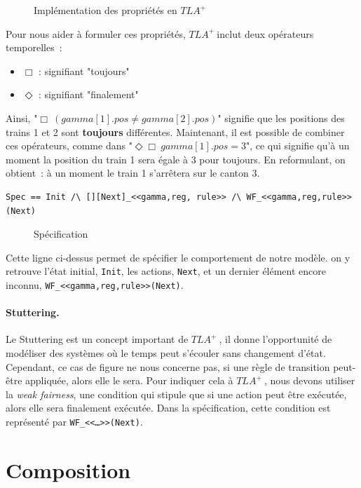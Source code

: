 \documentclass[oneside, a4paper, 11pt]{book}
\newcommand{\TLA}{\ensuremath{TLA^+~}}
\begin{document}
\begin{figure}[h]
	\caption{Implémentation des propriétés en \TLA}
	\label{fig:propertiesTLA}
\end{figure}

\noindent
Pour nous aider à formuler ces propriétés, \TLA inclut deux opérateurs temporelles~:
\begin{itemize}
	\item $\Box$ : signifiant "toujours"
	\item $\Diamond$ : signifiant "finalement"
\end{itemize}
\noindent
Ainsi, "$\Box~(gamma[1].pos \neq gamma[2].pos)$" signifie que les positions des trains 1 et 2 sont \textbf{toujours} différentes.
Maintenant, il est possible de combiner ces opérateurs, comme dans "$\Diamond \Box~gamma[1].pos = 3$", ce qui signifie qu'à un moment la position du train 1 sera égale à 3 pour toujours. En reformulant, on obtient~: à un moment le train 1 s'arrêtera sur le canton 3.

\begin{verbatim}
Spec == Init /\ [][Next]_<<gamma,reg, rule>> /\ WF_<<gamma,reg,rule>>(Next)
\end{verbatim}

\begin{figure}[h]
	\caption{Spécification}
	\label{fig:specTLA}
\end{figure}

Cette ligne ci-dessus permet de spécifier le comportement de notre modèle. on y retrouve l'état initial, \texttt{Init}, les actions, \texttt{Next}, et un dernier élément encore inconnu, \texttt{WF\_<<gamma,reg,rule>>(Next)}. 

\paragraph{Stuttering.} Le Stuttering est un concept important de \TLA, il donne l'opportunité de modéliser des systèmes où le temps peut s'écouler sans changement d'état. Cependant, ce cas de figure ne nous concerne pas, si une règle de transition peut-être appliquée, alors elle le sera.
Pour indiquer cela à \TLA, nous devons utiliser la \textit{weak fairness}, une condition qui stipule que si une action peut être exécutée, alors elle sera finalement exécutée. Dans la spécification, cette condition est représenté par \texttt{WF\_<<\dots>>(Next)}.



\section{Composition}
\label{sec:composition}
\end{document}
